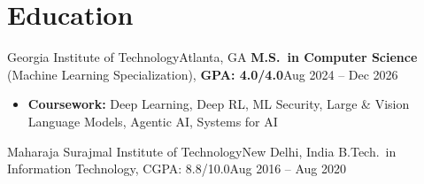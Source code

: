 \documentclass[letterpaper,11pt]{article}
\begin{document}
\section{Education}
\resumeSubHeadingListStart
\resumeSubheading
{Georgia Institute of Technology}{Atlanta, GA}
{\textbf{M.S.\ in Computer Science} (Machine Learning Specialization), \textbf{GPA: 4.0/4.0}}{Aug 2024 -- Dec 2026}
\vspace{2pt}
\begin{itemize}[leftmargin=0.20in, topsep=2pt, itemsep=0pt]
  \item\footnotesize{\textbf{Coursework:} Deep Learning, Deep RL, ML Security, Large \& Vision Language Models, Agentic AI, Systems for AI}
\end{itemize}
\vspace{-2pt}
\resumeEducationCompact
{Maharaja Surajmal Institute of Technology}{New Delhi, India}
{B.Tech.\ in Information Technology, CGPA: 8.8/10.0}{Aug 2016 -- Aug 2020}
\resumeSubHeadingListEnd
\end{document}
